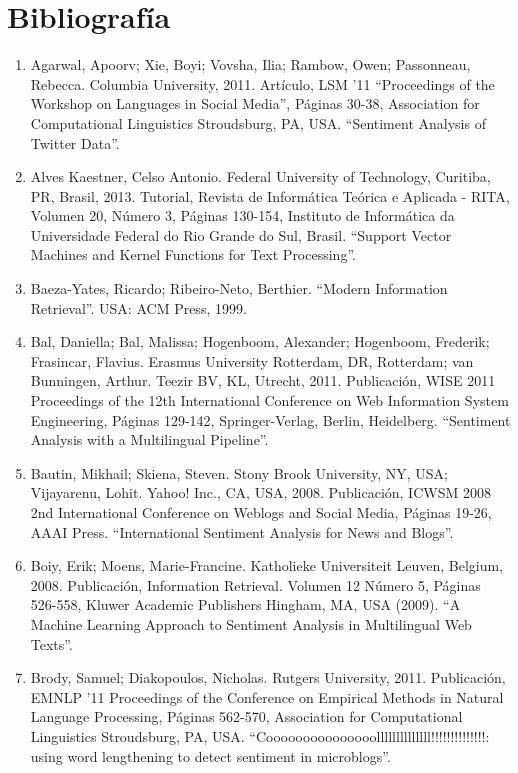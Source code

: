 \chapter{Bibliograf\'ia}\label{Bibliografia}
\begin{enumerate}
\item Agarwal, Apoorv; Xie, Boyi; Vovsha, Ilia; Rambow, Owen; Passonneau, Rebecca. Columbia University, 2011. Art\'iculo, LSM '11 ``Proceedings of the Workshop on Languages in Social Media'', P\'aginas 30-38, Association for Computational Linguistics Stroudsburg, PA, USA. ``Sentiment Analysis of Twitter Data''.
\item Alves Kaestner, Celso Antonio. Federal University of Technology, Curitiba, PR, Brasil, 2013. Tutorial, Revista de Inform\'atica Te\'orica e Aplicada - RITA, Volumen 20, N\'umero 3, P\'aginas 130-154,  Instituto de Inform\'atica da Universidade Federal do Rio Grande do Sul, Brasil. ``Support Vector Machines and Kernel Functions for Text Processing''. 
\item Baeza-Yates, Ricardo; Ribeiro-Neto, Berthier. ``Modern Information Retrieval''. USA: ACM Press, 1999.
\item Bal, Daniella; Bal, Malissa; Hogenboom, Alexander; Hogenboom, Frederik; Frasincar, Flavius. Erasmus University Rotterdam, DR, Rotterdam; van Bunningen, Arthur. Teezir BV, KL, Utrecht, 2011. Publicaci\'on, WISE 2011 Proceedings of the 12th International Conference on Web Information System Engineering, P\'aginas 129-142, Springer-Verlag, Berlin, Heidelberg. ``Sentiment Analysis with a Multilingual Pipeline''.
\item Bautin, Mikhail; Skiena, Steven. Stony Brook University, NY, USA; Vijayarenu, Lohit. Yahoo! Inc., CA, USA, 2008. Publicaci\'on, ICWSM 2008 2nd International Conference on Weblogs and Social Media, P\'aginas 19-26, AAAI Press. ``International Sentiment Analysis for News and Blogs''.
\item Boiy, Erik; Moens, Marie-Francine. Katholieke Universiteit Leuven, Belgium, 2008. Publicaci\'on, Information Retrieval. Volumen 12 N\'umero 5, P\'aginas 526-558, Kluwer Academic Publishers Hingham, MA, USA (2009). ``A Machine Learning Approach to Sentiment Analysis in Multilingual Web Texts''.
\item Brody, Samuel; Diakopoulos, Nicholas. Rutgers University, 2011. Publicaci\'on, EMNLP '11 Proceedings of the Conference on Empirical Methods in Natural Language Processing, P\'aginas 562-570, Association for Computational Linguistics Stroudsburg, PA, USA.
\newline ``Cooooooooooooooollllllllllllll!!!!!!!!!!!!!!: using word lengthening to detect sentiment in microblogs''.

\end{enumerate}
